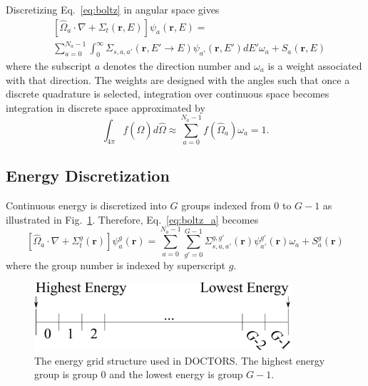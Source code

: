 Discretizing Eq.~\ref{eq:boltz} in angular space gives
\begin{equation} \label{eq:boltz_a}
\begin{split}
&\left[ \hat{\Omega}_a \cdot \nabla + \Sigma_t(\boldsymbol{r}, E) \right]
\psi_{a}(\boldsymbol{r}, E) = \\
&\sum_{a=0}^{N_a-1} \int_0^\infty \Sigma_{s, a, a'}(\boldsymbol{r}, E' \rightarrow E) \psi_{a'}(\boldsymbol{r}, E') dE' \omega_a + S_a(\boldsymbol{r}, E)
\end{split}
\end{equation}
where the subscript $a$ denotes the direction number and $\omega_a$ is a weight associated with that direction. The weights are designed with the angles such that once a discrete quadrature is selected, integration over continuous space becomes integration in discrete space approximated by
\begin{equation} \label{eq:disc_int}
\int_{4 \pi} f(\hat{\Omega}) d\hat{\Omega} \approx \sum_{a=0}^{N_a-1} f(\hat{\Omega}_a) \omega_a = 1.
\end{equation}

\subsection{Energy Discretization}

Continuous energy is discretized into $G$ groups indexed from 0 to $G-1$ as illustrated in Fig.~\ref{fig:energy_groups}. Therefore, Eq.~\ref{eq:boltz_a} becomes
\begin{equation} \label{eq:boltz_e}
\left[ \hat{\Omega}_a \cdot \nabla + \Sigma_t^g(\boldsymbol{r}) \right]
\psi_{a}^{g}(\boldsymbol{r}) = 
\sum_{a=0}^{N_a-1} \sum_{g'=0}^{G-1} \Sigma_{s, a, a'}^{g, g'}(\boldsymbol{r}) \psi_{a'}^{g'}(\boldsymbol{r}) \omega_a + S_a^g(\boldsymbol{r})
\end{equation}
where the group number is indexed by superscript $g$.

\begin{figure}[tb]
  \begin{center}
   \includegraphics[width=3.75in]{figs/energy_groups}
  \end{center}
  \caption{The energy grid structure used in DOCTORS. The highest energy group is group 0 and the lowest energy is group $G-1$.}
\label{fig:energy_groups}
\end{figure}

